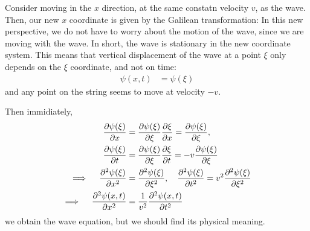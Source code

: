 Consider moving in the $x$ direction, at the same constatn velocity $v$, as the wave.
Then, our new $x$ coordinate is given by the Galilean transformation:
In this new perspective, we do not have to worry about the motion of the wave, since we are moving with the wave.
In short, the wave is stationary in the new coordinate system.
This means that vertical displacement of the wave at a point $\xi$ only depends on the $\xi$ coordinate, and not on time:
\begin{align}
  \psi(x, t) & = \psi(\xi)
\end{align}
and any point on the string seems to move at velocity $-v$.

Then immidiately,
\begin{align}
  \pdv{\psi(\xi)}{x}                    & = \pdv{\psi(\xi)}{\xi} \pdv{\xi}{x} = \pdv{\psi(\xi)}{\xi},                          \\
  \pdv{\psi(\xi)}{t}                    & = \pdv{\psi(\xi)}{\xi} \pdv{\xi}{t} = -v \pdv{\psi(\xi)}{\xi}                        \\
  \implies \quad \pdv[2]{\psi(\xi)}{x}  & = \pdv[2]{\psi(\xi)}{\xi}, \quad \pdv[2]{\psi(\xi)}{t} = v^2 \pdv[2]{\psi(\xi)}{\xi} \\
  \implies \quad \pdv[2]{\psi(x, t)}{x} & = \frac{1}{v^2} \pdv[2]{\psi(x, t)}{t}
\end{align}
we obtain the wave equation, but we should find its physical meaning.



